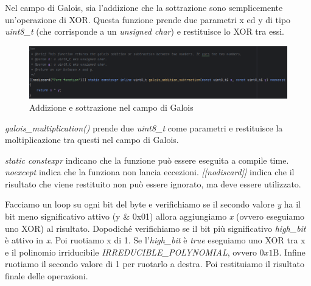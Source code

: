 \textsf{\small Nel campo di Galois, sia l'addizione che la sottrazione sono semplicemente un'operazione di XOR. Questa funzione prende due parametri x ed y di tipo \emph{uint8\_t} (che corrisponde a un \emph{unsigned char}) e restituisce lo XOR tra essi.}

\begin{figure}[H]
	\centering
	\includegraphics[width=1\textwidth, height=1\textheight, keepaspectratio]{./images/code/cpp/galois_math/galois_addition_subtraction.PNG}
	\caption{Addizione e sottrazione nel campo di Galois}
	\label{fig:galois_addition_subtraction}
\end{figure}

\textsf{\small \emph{galois\_multiplication()} prende due \emph{uint8\_t} come parametri e restituisce la moltiplicazione tra questi nel campo di Galois.}

\textsf{\emph{static constexpr} indicano che la funzione può essere eseguita a compile time. \emph{noexcept} indica che la funziona non lancia eccezioni. \emph{[[nodiscard]]} indica che il risultato che viene restituito non può essere ignorato, ma deve essere utilizzato.}


\textsf{\small Facciamo un loop su ogni bit del byte e verifichiamo se il secondo valore \emph{y} ha il bit meno significativo attivo (y \& 0x01) allora aggiungiamo \emph{x} (ovvero eseguiamo uno XOR) al risultato. Dopodiché verifichiamo se il bit più significativo \emph{high\_bit} è attivo in \emph{x}. Poi ruotiamo x di 1. Se l'\emph{high\_bit} è \emph{true} eseguiamo uno XOR tra x e il polinomio irriducibile \emph{IRREDUCIBLE\_POLYNOMIAL}, ovvero $0x1\text{B}$. Infine ruotiamo il secondo valore di 1 per ruotarlo a destra. Poi restituiamo il risultato finale delle operazioni.}

